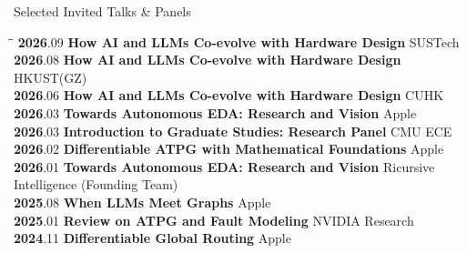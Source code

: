\begin{rSection}{Selected Invited Talks \& Panels}

    \begin{tabbing}
        \hspace{.7in}\= \hspace{4in}\=  \kill
        \textcolor{CUHKblue}{\textbf{2026}}.09 \>  \textbf{How AI and LLMs Co-evolve with Hardware Design} \> SUSTech  \\
        \textcolor{CUHKblue}{\textbf{2026}}.08 \>  \textbf{How AI and LLMs Co-evolve with Hardware Design} \> HKUST(GZ)  \\
        \textcolor{CUHKblue}{\textbf{2026}}.06 \>  \textbf{How AI and LLMs Co-evolve with Hardware Design} \> CUHK  \\
        \textcolor{CUHKblue}{\textbf{2026}}.03 \>  \textbf{Towards Autonomous EDA: Research and Vision} \> Apple  \\
        \textcolor{CUHKblue}{\textbf{2026}}.03 \>  \textbf{Introduction to Graduate Studies: Research Panel} \> CMU ECE  \\
        \textcolor{CUHKblue}{\textbf{2026}}.02 \>  \textbf{Differentiable ATPG with Mathematical Foundations} \> Apple  \\
        \textcolor{CUHKblue}{\textbf{2026}}.01 \>  \textbf{Towards Autonomous EDA: Research and Vision} \> Ricursive Intelligence (Founding Team)  \\
        \textcolor{CUHKblue}{\textbf{2025}}.08 \>  \textbf{When LLMs Meet Graphs} \> Apple  \\
        \textcolor{CUHKblue}{\textbf{2025}}.01 \>  \textbf{Review on ATPG and Fault Modeling} \> NVIDIA Research  \\
        \textcolor{CUHKblue}{\textbf{2024}}.11 \>  \textbf{Differentiable Global Routing} \> Apple  \\

    \end{tabbing}

\end{rSection}
